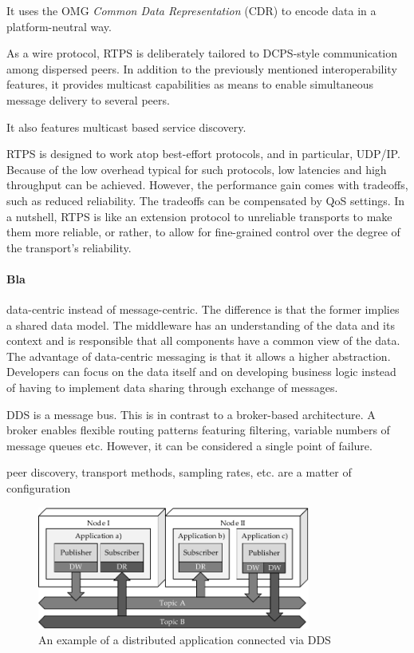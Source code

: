 It uses the OMG \emph{Common Data Representation} (CDR) to encode data in a platform-neutral way. 

As a wire protocol, RTPS is deliberately tailored to DCPS-style communication among dispersed peers. In addition to the previously mentioned interoperability features, it provides multicast capabilities as means to enable simultaneous message delivery to several peers.

It also features multicast based service discovery.

RTPS is designed to work atop best-effort protocols, and in particular, UDP/IP. Because of the low overhead typical for such protocols, low latencies and high throughput can be achieved. However, the performance gain comes with tradeoffs, such as reduced reliability. The tradeoffs can be compensated by QoS settings. In a nutshell, RTPS is like an extension protocol to unreliable transports to make them more reliable, or rather, to allow for fine-grained control over the degree of the transport's reliability.



\paragraph{Bla}

data-centric instead of message-centric. The difference is that the former implies a shared data model. The middleware has an understanding of the data and its context and is responsible that all components have a common view of the data.
The advantage of data-centric messaging is that it allows a higher abstraction. Developers can focus on the data itself and on developing business logic instead of having to implement data sharing through exchange of messages.

DDS is a message bus. This is in contrast to a broker-based architecture. A broker enables flexible routing patterns featuring filtering, variable numbers of message queues etc. However, it can be considered a single point of failure.

peer discovery, transport methods, sampling rates, etc. are a matter of configuration


\begin{figure}[htpb]
  \centering
  \includegraphics[width=0.8\textwidth]{figures/dds.pdf}
  \caption[An example of a distributed application connected via DDS]{An example of a distributed application connected via DDS}\label{fig:dds}
\end{figure}

